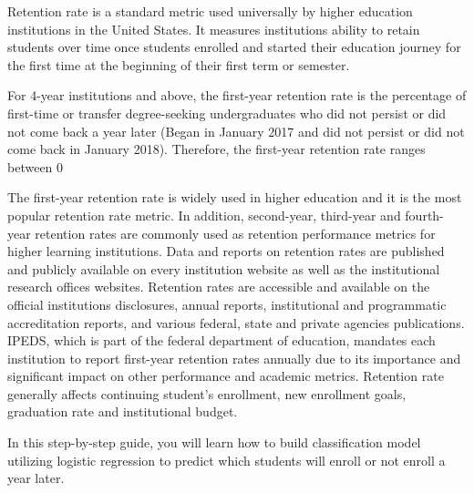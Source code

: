 \documentclass[12pt,a4paper,oneside]{book}
\begin{document}
Retention rate is a standard metric used universally by higher education institutions in the United States. It measures institutions ability to retain students over time once students enrolled and started their education journey for the first time at the beginning of their first term or semester. 

\par For 4-year institutions and above, the first-year retention rate is the percentage of first-time or transfer degree-seeking undergraduates who did not persist or did not come back a year later (Began in January 2017 and did not persist or did not come back in January 2018). Therefore, the first-year retention rate ranges between 0%
 
\par The first-year retention rate is widely used in higher education and it is the most popular retention rate metric. In addition, second-year, third-year and fourth-year retention rates are commonly used as retention performance metrics for higher learning institutions. Data and reports on retention rates are published and publicly available on every institution website as well as the institutional research offices websites. Retention rates are accessible and available on the official institutions disclosures, annual reports, institutional and programmatic accreditation reports, and various federal, state and private agencies publications. IPEDS, which is part of the federal department of education, mandates each institution to report first-year retention rates annually due to its importance and significant impact on other performance and academic metrics. Retention rate generally affects continuing student’s enrollment, new enrollment goals, graduation rate and institutional budget.

\par In this step-by-step guide, you will learn how to build classification model utilizing logistic regression to predict which students will enroll or not enroll a year later.  
\end{document}
